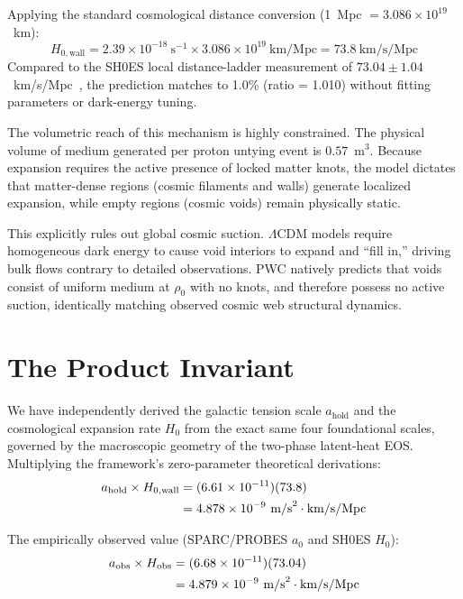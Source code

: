 \documentclass[aps,prd,twocolumn,superscriptaddress,amsmath,amssymb,nofootinbib,floatfix]{revtex4-2}
\newcommand{\amax}{a_{\text{hold}}}
\newcommand{\rhonaught}{\rho_{0}}
\newcommand{\Hwall}{H_{0,\text{wall}}}
\begin{document}
Applying the standard cosmological distance conversion (1~Mpc $= 3.086 \times 10^{19}$~km):
\begin{equation}
\boxed{\Hwall = 2.39 \times 10^{-18}~\text{s}^{-1} \times 3.086 \times 10^{19}~\text{km/Mpc} = 73.8~\text{km/s/Mpc}}
\label{eq:h0result}
\end{equation}
Compared to the SH0ES local distance-ladder measurement of $73.04 \pm 1.04$~km/s/Mpc~\cite{Riess2022}, the prediction matches to 1.0\% (ratio = 1.010) without fitting parameters or dark-energy tuning.

The volumetric reach of this mechanism is highly constrained. The physical volume of medium generated per proton untying event is $0.57$~m$^3$. Because expansion requires the active presence of locked matter knots, the model dictates that matter-dense regions (cosmic filaments and walls) generate localized expansion, while empty regions (cosmic voids) remain physically static.

This explicitly rules out global cosmic suction. $\Lambda$CDM models require homogeneous dark energy to cause void interiors to expand and ``fill in,'' driving bulk flows contrary to detailed observations. PWC natively predicts that voids consist of uniform medium at $\rhonaught$ with no knots, and therefore possess no active suction, identically matching observed cosmic web structural dynamics.

\section{The Product Invariant}
\label{sec:product}

We have independently derived the galactic tension scale $\amax$ and the cosmological expansion rate $H_0$ from the exact same four foundational scales, governed by the macroscopic geometry of the two-phase latent-heat EOS. Multiplying the framework's zero-parameter theoretical derivations:
\begin{align}
\amax \times \Hwall &= (6.61 \times 10^{-11})(73.8) \notag \\
&= 4.878 \times 10^{-9}~\text{m/s}^{2}\cdot\text{km/s/Mpc}
\label{eq:productframework}
\end{align}

The empirically observed value (SPARC/PROBES $a_0$ and SH0ES $H_0$):
\begin{align}
a_{\text{obs}} \times H_{\text{obs}} &= (6.68 \times 10^{-11})(73.04) \notag \\
&= 4.879 \times 10^{-9}~\text{m/s}^{2}\cdot\text{km/s/Mpc}
\label{eq:productobs}
\end{align}
\end{document}
